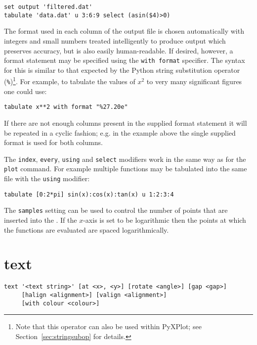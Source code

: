 \begin{verbatim}
set output 'filtered.dat'
tabulate 'data.dat' u 3:6:9 select (asin($4)>0)
\end{verbatim}

The format used in each column of the output file is chosen automatically with
integers and small numbers treated intelligently to produce output which
preserves accuracy, but is also easily human-readable. If desired, however, a
format statement may be specified using the {\tt with format} specifier. The
syntax for this is similar to that expected by the Python string substitution
operator ({\tt \%})\footnote{Note that this operator can also be used
within PyXPlot; see Section~\ref{sec:stringsubop} for details.}.  For example,
to tabulate the values of $x^2$ to very many significant figures one could use:

\begin{verbatim}
tabulate x**2 with format "%27.20e"
\end{verbatim}

If there are not enough columns present in the supplied format statement it
will be repeated in a cyclic fashion; e.g. in the example above the single
supplied format is used for both columns.

The {\tt index}, {\tt every}, {\tt using} and {\tt select} modifiers work in the
same way as for the {\tt plot} command.  For example multiple functions may be
tabulated into the same file with the {\tt using} modifier:

\begin{verbatim}
tabulate [0:2*pi] sin(x):cos(x):tan(x) u 1:2:3:4
\end{verbatim}

The {\tt samples} setting can be used to control the number of points that are
inserted into the \datafile.  If the $x$-axis is set to be logarithmic then the
points at which the functions are evaluated are spaced logarithmically.


\section{text}

\begin{verbatim}
text '<text string>' [at <x>, <y>] [rotate <angle>] [gap <gap>]
     [halign <alignment>] [valign <alignment>]
     [with colour <colour>]
\end{verbatim}

